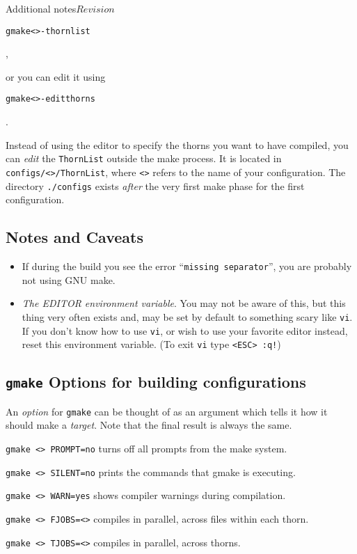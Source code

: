\begin{cactuspart}{Additional notes}{}{$Revision$}
\begin{alltt}
gmake <>-thornlist
\end{alltt},

or you can edit it using

\begin{alltt}
gmake <>-editthorns
\end{alltt}.

Instead of using the editor to specify the thorns you want to
  have compiled, you can \emph{edit} the \texttt{ThornList} outside
  the make process. It is located in \texttt{configs/<>/ThornList},
  where \texttt{<>} refers to the name of your configuration.
  The directory \texttt{./configs} exists \emph{ after} the very first
  make phase for the first configuration.

\subsection{Notes and Caveats}
\begin{itemize}
\item{} If during the build you see the error ``\texttt{missing
    separator}'', you are probably not using GNU make.
\item{} \textit{The EDITOR environment variable}. You may not be aware of
  this, but this thing very often exists and, may be set  by default to
  something scary like \texttt{vi}. If you don't know how to use \texttt{vi},
  or wish to
  use your favorite editor instead, reset this environment variable.
  (To exit \texttt{vi} type \texttt{<ESC> :q!})
\end{itemize}

\subsection{\texttt{gmake} Options for building configurations}
\label{sec:gmopfobuco}

An \textit{option} for \texttt{gmake} can be thought of as an argument which tells
it how it should make a \textit{target}. Note that the final result is always
the same.

\begin{Lentry}
\item [\texttt{gmake <\var{target}> PROMPT=no}] turns off all prompts from the
make system.
\item [\texttt{gmake <\var{target}> SILENT=no}] prints the commands that gmake
is executing.
\item [\texttt{gmake <\var{target}> WARN=yes}] shows compiler warnings during
compilation.
\item [\texttt{gmake <\var{target}> FJOBS=<\var{number}>}] compiles in parallel,
across files within each thorn.
\item [\texttt{gmake <\var{target}> TJOBS=<\var{number}>}] compiles in parallel,
across thorns.


\end{Lentry}
\end{cactuspart}
